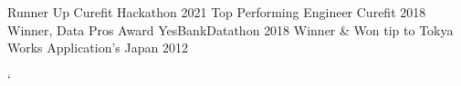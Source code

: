 


\begin{cvhonors}

  \cvhonor
    {Runner Up}
    {Curefit Hackathon}
    {}
    {2021} %
  \cvhonor
    {Top Performing Engineer} %
    {Curefit} %
    {} %
    {2018} %
  \cvhonor
    {Winner, Data Pros Award} %
    {YesBankDatathon} %
    {} %
    {2018} %
  \cvhonor
    {Winner \& Won tip to Tokya} %
    {Works Application’s Japan} %
    {} %
    {2012} %
\end{cvhonors}`